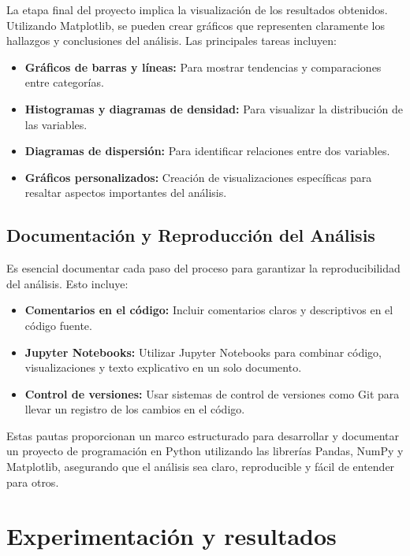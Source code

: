 \documentclass[conference]{IEEEtran}
\begin{document}
    La etapa final del proyecto implica la visualización de los resultados obtenidos. Utilizando Matplotlib, se pueden crear gráficos que representen claramente los hallazgos y conclusiones del análisis. Las principales tareas incluyen:
    
    \begin{itemize}
        \item \textbf{Gráficos de barras y líneas:} Para mostrar tendencias y comparaciones entre categorías.
        \item \textbf{Histogramas y diagramas de densidad:} Para visualizar la distribución de las variables.
        \item \textbf{Diagramas de dispersión:} Para identificar relaciones entre dos variables.
        \item \textbf{Gráficos personalizados:} Creación de visualizaciones específicas para resaltar aspectos importantes del análisis.
    \end{itemize}
    
    \subsection{Documentación y Reproducción del Análisis}
    
    Es esencial documentar cada paso del proceso para garantizar la reproducibilidad del análisis. Esto incluye:
    
    \begin{itemize}
        \item \textbf{Comentarios en el código:} Incluir comentarios claros y descriptivos en el código fuente.
        \item \textbf{Jupyter Notebooks:} Utilizar Jupyter Notebooks para combinar código, visualizaciones y texto explicativo en un solo documento.
        \item \textbf{Control de versiones:} Usar sistemas de control de versiones como Git para llevar un registro de los cambios en el código.
    \end{itemize}
    
    Estas pautas proporcionan un marco estructurado para desarrollar y documentar un proyecto de programación en Python utilizando las librerías Pandas, NumPy y Matplotlib, asegurando que el análisis sea claro, reproducible y fácil de entender para otros.
    
\section{Experimentaci\'on y resultados}
\end{document}
